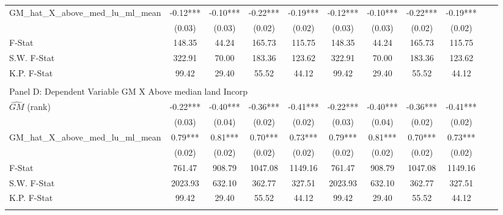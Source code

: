 \begin{table}[htbp]
\begin{threeparttable}
\begin{tabular}{l*{10}{c}}
\addlinespace
GM\_hat\_X\_above\_med\_lu\_ml\_mean&      -0.12***&      -0.10***&      -0.22***&      -0.19***&      -0.12***&      -0.10***&      -0.22***&      -0.19***\\
                &     (0.03)   &     (0.03)   &     (0.02)   &     (0.02)   &     (0.03)   &     (0.03)   &     (0.02)   &     (0.02)   \\
\midrule
F-Stat          &     148.35   &      44.24   &     165.73   &     115.75   &     148.35   &      44.24   &     165.73   &     115.75   \\
S.W. F-Stat     &     322.91   &      70.00   &     183.36   &     123.62   &     322.91   &      70.00   &     183.36   &     123.62   \\
K.P. F-Stat     &      99.42   &      29.40   &      55.52   &      44.12   &      99.42   &      29.40   &      55.52   &      44.12   \\
\cmidrule[\heavyrulewidth](lr){1-9} \\ \cmidrule[\heavyrulewidth](lr){1-9}
\multicolumn{8}{l}{Panel D: Dependent Variable GM X Above median land Incorp}\\
\cmidrule(lr){1-9}
$\hat{GM}$ (rank)&      -0.22***&      -0.40***&      -0.36***&      -0.41***&      -0.22***&      -0.40***&      -0.36***&      -0.41***\\
                &     (0.03)   &     (0.04)   &     (0.02)   &     (0.02)   &     (0.03)   &     (0.04)   &     (0.02)   &     (0.02)   \\
\addlinespace
GM\_hat\_X\_above\_med\_lu\_ml\_mean&       0.79***&       0.81***&       0.70***&       0.73***&       0.79***&       0.81***&       0.70***&       0.73***\\
                &     (0.02)   &     (0.02)   &     (0.02)   &     (0.02)   &     (0.02)   &     (0.02)   &     (0.02)   &     (0.02)   \\
\midrule
F-Stat          &     761.47   &     908.79   &    1047.08   &    1149.16   &     761.47   &     908.79   &    1047.08   &    1149.16   \\
S.W. F-Stat     &    2023.93   &     632.10   &     362.77   &     327.51   &    2023.93   &     632.10   &     362.77   &     327.51   \\
K.P. F-Stat     &      99.42   &      29.40   &      55.52   &      44.12   &      99.42   &      29.40   &      55.52   &      44.12   \\
\cmidrule[\heavyrulewidth](lr){1-9} \\ \cmidrule[\heavyrulewidth](lr){1-9}

\end{tabular}
\end{threeparttable}
\end{table}
